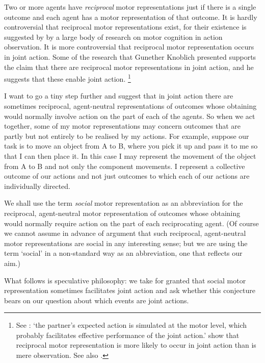\documentclass[12pt,\papersize]{extarticle}
\begin{document}
Two or more agents have \emph{reciprocal} motor representations  just if there is a single outcome and each agent has a motor representation of that outcome. 
It is hardly controversial that reciprocal motor representations exist, for their existence is suggested by by a large body of research on motor cognition in action observation.
It is more controversial that reciprocal motor representation occurs in joint action.
Some of the research that Gunether Knoblich presented supports the claim that there are reciprocal motor representations in joint action, and he suggests that these enable joint action.%
\footnote{
See \citet{kourtis:2012_predictive}: `the partner’s expected action is simulated at the motor level, which probably facilitates effective performance of the joint action.'
\citet{kourtis:2010_favoritism} show that 
reciprocal motor representation is more likely to occur in joint action than is mere observation. 
See also \citet{Knoblich:2003nf}.
 }

I want to go a tiny step further and suggest that in joint action there are sometimes reciprocal, agent-neutral representations of outcomes whose obtaining would normally involve action on the part of each of the agents.
So when we act together, some of my motor representations may concern outcomes that are partly but not entirely to be realised by my actions.
For example, suppose our task is to move an object from A to B, where you pick it up and pass it to me so that I can then place it.
In this case I may represent the movement of the object from A to B and not only the component movements.
I represent a collective outcome of our actions and not just outcomes to which each of our actions are individually directed.
%

We shall use the term \emph{social} motor representation as an abbreviation for the reciprocal, agent-neutral motor representation of outcomes whose obtaining would normally require action on the part of each reciprocating agent.
(Of course we cannot assume in advance of argument that such reciprocal, agent-neutral motor representations are social in any interesting sense;
but we are using the term `social' in a non-standard way as an abbreviation, one that reflects our aim.)

What follows is speculative philosophy: we take for granted that  social motor representation sometimes facilitates joint action and ask whether this conjecture bears on our question about which events are joint actions.
\end{document}
